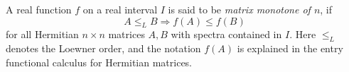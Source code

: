 \documentclass[12pt]{article}
\begin{document}
A real function $f$ on a real interval $I$ is said to be \emph{matrix monotone of  $n$}, if \\
\begin{equation}
A \leq_L B  \Rightarrow f(A) \leq f(B)
\end{equation}
for all Hermitian $n \times n$ matrices $A, B$ with spectra contained in $I$.  Here $\leq_L$ denotes the Loewner order, and the notation $f(A)$ is explained in the entry functional calculus for Hermitian matrices.
\end{document}
